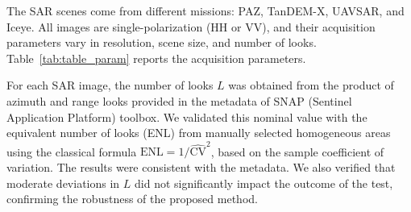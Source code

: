 \documentclass[
  lettersize  journal,
]{IEEEtran}%
\providecommand{\DIFaddtex}[1]{{\protect\color{blue}\uwave{#1}}} %
\providecommand{\DIFaddFL}[1]{\DIFadd{#1}} %
\providecommand{\DIFaddbeginFL}{} %
\providecommand{\DIFaddendFL}{} %
\providecommand{\DIFadd}[1]{\texorpdfstring{\DIFaddtex{#1}}{#1}} %
\providecommand{\DIFaddincludegraphics}[2][]{{\color{blue}\fbox{\DIFOincludegraphics[#1]{#2}}}} %
\DeclareRobustCommand{\DIFaddbeginFL}{\DIFOaddbeginFL \let\includegraphics\DIFaddincludegraphics} %
\DeclareRobustCommand{\DIFaddendFL}{\DIFOaddendFL \let\includegraphics\DIFOincludegraphics} %
\begin{document}
The SAR scenes come from different missions: PAZ, TanDEM-X, UAVSAR, and
Iceye. All images are single-polarization (HH or VV), and their
acquisition parameters vary in resolution, scene size, and number of
looks. Table~\ref{tab:table_param} reports the acquisition parameters.

\renewcommand{\arraystretch}{2.5}

\begin{table}[hbt]
\centering\centering
\caption{\label{tab:table_param}Parameters of selected SAR images\DIFaddbeginFL \DIFaddFL{.}\DIFaddendFL }
\centering
{}
\end{table}

For each SAR image, the number of looks \(L\) was obtained from the
product of azimuth and range looks provided in the metadata of SNAP
(Sentinel Application Platform) toolbox. We validated this nominal value
with the equivalent number of looks (ENL) from manually selected
homogeneous areas using the classical formula
\(\text{ENL} = 1/\widehat{\text{CV}}^2\), based on the sample
coefficient of variation. The results were consistent with the metadata.
We also verified that moderate deviations in \(L\) did not significantly
impact the outcome of the test, confirming the robustness of the
proposed method.
\end{document}
